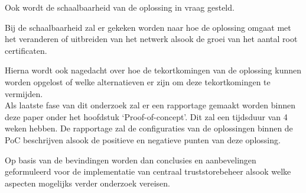 Ook wordt de schaalbaarheid van de oplossing in vraag gesteld.

Bij de schaalbaarheid zal er gekeken worden naar hoe de oplossing omgaat met het veranderen of uitbreiden van het netwerk alsook de groei van het aantal root certificaten.

Hierna wordt ook nagedacht over hoe de tekortkomingen van de oplossing kunnen worden opgelost of welke alternatieven er zijn om deze tekortkomingen te vermijden. \\


Als laatste fase van dit onderzoek zal er een rapportage gemaakt worden binnen deze paper onder het hoofdstuk `Proof-of-concept'. Dit zal een tijdsduur van 4 weken hebben. De rapportage zal de configuraties van de oplossingen binnen de PoC beschrijven alsook de positieve en negatieve punten van deze oplossing.

Op basis van de bevindingen worden dan conclusies en aanbevelingen geformuleerd voor de implementatie van centraal truststorebeheer alsook welke aspecten mogelijks verder onderzoek vereisen.


